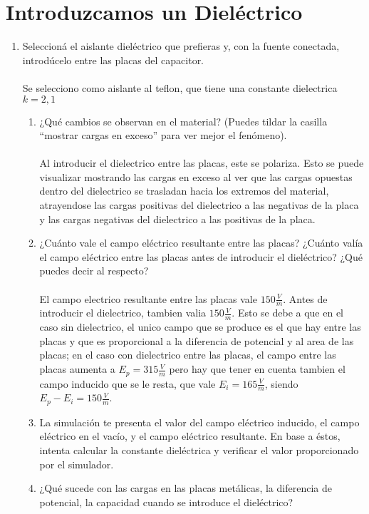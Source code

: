 \documentclass[12pt]{report}
\begin{document}
\section{Introduzcamos un Dieléctrico}

\begin{enumerate}
    \item Seleccioná el aislante dieléctrico que prefieras y, con la fuente conectada, introdúcelo entre las placas del capacitor.
        \\\\Se selecciono como aislante al teflon, que tiene una constante dielectrica $k = 2,1$
    \begin{enumerate}
        \item ¿Qué cambios se observan en el material? (Puedes tildar la casilla “mostrar cargas en exceso” para ver mejor el fenómeno).
        \\\\Al introducir el dielectrico entre las placas, este se polariza. Esto se puede visualizar mostrando las cargas en exceso al ver que las cargas opuestas dentro del dielectrico se trasladan hacia los extremos del material, atrayendose las cargas positivas del dielectrico a las negativas de la placa y las cargas negativas del dielectrico a las positivas de la placa.
        \item ¿Cuánto vale el campo eléctrico resultante entre las placas? ¿Cuánto valía el campo eléctrico entre las placas antes de introducir el dieléctrico? ¿Qué puedes decir al respecto?
        \\\\El campo electrico resultante entre las placas vale $150\frac{V}{m}$. Antes de introducir el dielectrico, tambien valia $150\frac{V}{m}$. Esto se debe a que en el caso sin dielectrico, el unico campo que se produce es el que hay entre las placas y que es proporcional a la diferencia de potencial y al area de las placas; en el caso con dielectrico entre las placas, el campo entre las placas aumenta a $E_p = 315\frac{V}{m}$ pero hay que tener en cuenta tambien el campo inducido que se le resta, que vale $E_i = 165\frac{V}{m}$, siendo $E_p - E_i = 150\frac{V}{m}$.
        \item La simulación te presenta el valor del campo eléctrico inducido, el campo eléctrico en el vacío, y el campo eléctrico resultante. En base a éstos, intenta calcular la constante dieléctrica y verificar el valor proporcionado por el simulador.
        \item ¿Qué sucede con las cargas en las placas metálicas, la diferencia de potencial, la capacidad cuando se introduce el dieléctrico?

\end{enumerate}
\end{enumerate}
\end{document}
